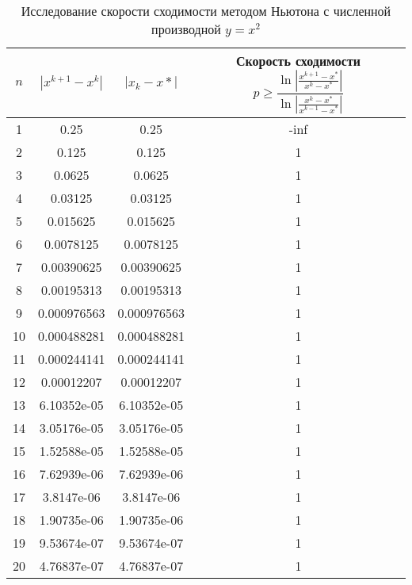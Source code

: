 \documentclass{article}
\begin{document}
    \begin{table}[H]
        \centering
        \caption{Исследование скорости сходимости методом Ньютона с численной производной \mbox{$y = x^2$}}
        \begin{tabular}{|c|c|c|c|}
            \hline
            $n$ & $|x^{k+1} - x^k|$ & $ |x_k - x*|$ & Скорость сходимости $p \geqslant \dfrac{\ln | \frac{x^{k+1}-x^*}{x^k - x^*} |}{\ln |\frac{x^k -x^*}{x^{k-1} - x^*}|}$ \\
            \hline 
            1 & 0.25 & 0.25 & -inf \\ \hline
            2 & 0.125 & 0.125 & 1 \\ \hline
            3 & 0.0625 & 0.0625 & 1 \\ \hline
            4 & 0.03125 & 0.03125 & 1 \\ \hline
            5 & 0.015625 & 0.015625 & 1 \\ \hline
            6 & 0.0078125 & 0.0078125 & 1 \\ \hline
            7 & 0.00390625 & 0.00390625 & 1 \\ \hline
            8 & 0.00195313 & 0.00195313 & 1 \\ \hline
            9 & 0.000976563 & 0.000976563 & 1 \\ \hline
            10 & 0.000488281 & 0.000488281 & 1 \\ \hline
            11 & 0.000244141 & 0.000244141 & 1 \\ \hline
            12 & 0.00012207 & 0.00012207 & 1 \\ \hline
            13 & 6.10352e-05 & 6.10352e-05 & 1 \\ \hline
            14 & 3.05176e-05 & 3.05176e-05 & 1 \\ \hline
            15 & 1.52588e-05 & 1.52588e-05 & 1 \\ \hline
            16 & 7.62939e-06 & 7.62939e-06 & 1 \\ \hline
            17 & 3.8147e-06 & 3.8147e-06 & 1 \\ \hline
            18 & 1.90735e-06 & 1.90735e-06 & 1 \\ \hline
            19 & 9.53674e-07 & 9.53674e-07 & 1 \\ \hline
            20 & 4.76837e-07 & 4.76837e-07 & 1 \\ \hline
        \end{tabular}
    \end{table}
\end{document}
